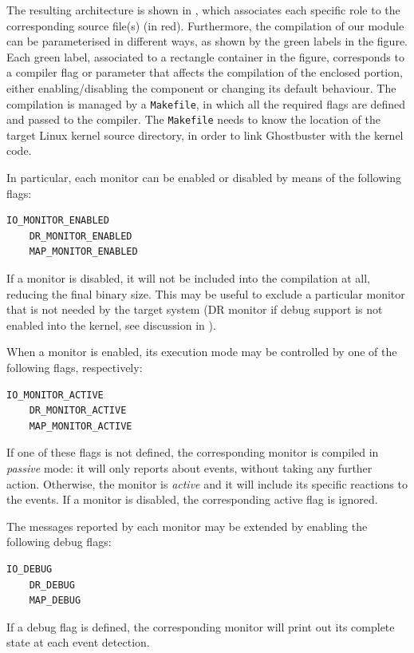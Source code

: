 The resulting architecture is shown in , which associates each specific role to the corresponding source file(s) (in red).
Furthermore, the compilation of our module can be parameterised in different ways, as shown by the green labels in the figure.
Each green label, associated to a rectangle container in the figure, corresponds to a compiler flag or parameter that affects the compilation of the enclosed portion,
either enabling/disabling the component or changing its default behaviour.
The compilation is managed by a \verb|Makefile|, in which all the required flags are defined and passed to the compiler.
The \verb|Makefile| needs to know the location of the target Linux kernel source directory, in order to link Ghostbuster with the kernel code.

In particular, each monitor can be enabled or disabled by means of the following flags:
\begin{Verbatim}[fontsize=\small]
	IO_MONITOR_ENABLED
	DR_MONITOR_ENABLED
	MAP_MONITOR_ENABLED
\end{Verbatim}
If a monitor is disabled, it will not be included into the compilation at all, reducing the final binary size.
This may be useful to exclude a particular monitor that is not needed by the target system
(\eg DR monitor if debug support is not enabled into the kernel, see discussion in ).

When a monitor is enabled, its execution mode may be controlled by one of the following flags, respectively:
\begin{Verbatim}[fontsize=\small]
	IO_MONITOR_ACTIVE
	DR_MONITOR_ACTIVE
	MAP_MONITOR_ACTIVE
\end{Verbatim}
If one of these flags is not defined, the corresponding monitor is compiled in \emph{passive} mode: it will only reports about events, without taking any further action.
Otherwise, the monitor is \emph{active} and it will include its specific reactions to the events.
If a monitor is disabled, the corresponding active flag is ignored.

The messages reported by each monitor may be extended by enabling the following debug flags:
\begin{Verbatim}[fontsize=\small]
	IO_DEBUG
	DR_DEBUG
	MAP_DEBUG
\end{Verbatim}
If a debug flag is defined, the corresponding monitor will print out its complete state at each event detection.

